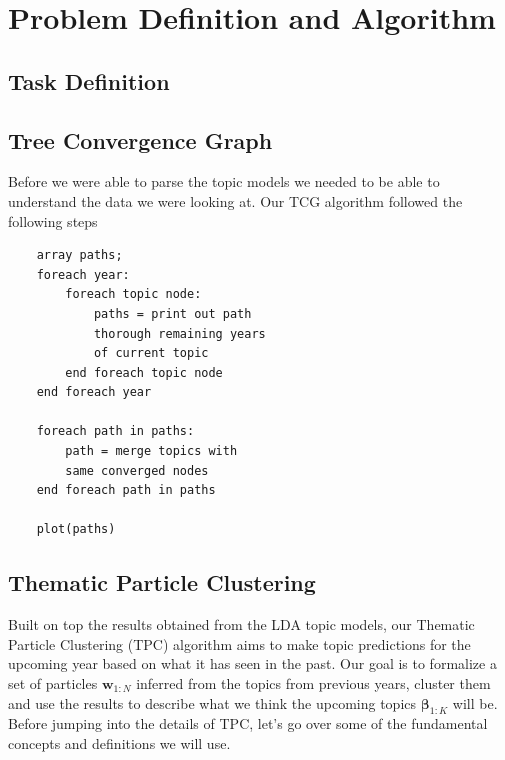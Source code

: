 \documentclass[conference]{IEEEtran}
\begin{document}
\section{Problem Definition and Algorithm}


\subsection{Task Definition}




\subsection{Tree Convergence Graph}
Before we were able to parse the topic models we needed to be able to understand the data we were looking at. Our TCG algorithm followed the following steps 
\begin{verbatim}
    array paths;
    foreach year:
        foreach topic node:
            paths = print out path 
            thorough remaining years 
            of current topic
        end foreach topic node
    end foreach year
    
    foreach path in paths:
        path = merge topics with
        same converged nodes
    end foreach path in paths
    
    plot(paths)
\end{verbatim}   

\subsection{Thematic Particle Clustering}

Built on top the results obtained from the LDA topic models, our Thematic Particle Clustering (TPC) algorithm aims to make topic predictions for the upcoming year based on what it has seen in the past. Our goal is to formalize a set of particles $\mathbf{w}_{1:N}$ inferred from the topics from previous years, cluster them and use the results to describe what we think the upcoming topics $\mathbf{\beta}_{1:K}$ will be. Before jumping into the details of TPC, let's go over some of the fundamental concepts and definitions we will use.
\end{document}
